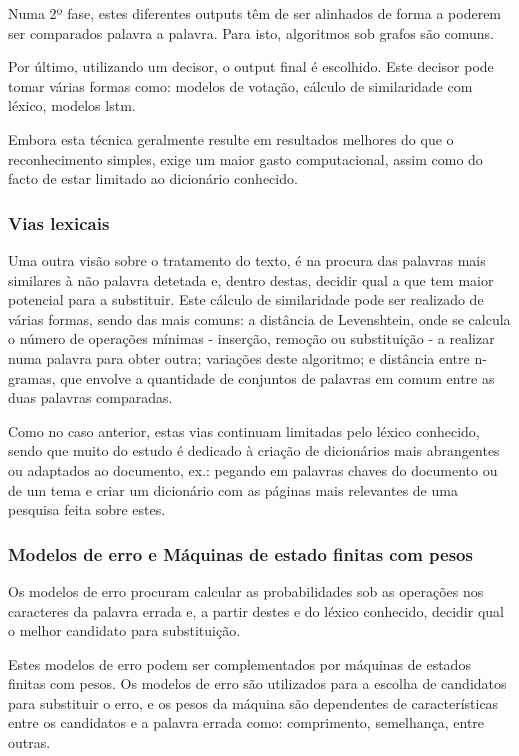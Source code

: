 Numa 2º fase, estes diferentes outputs têm de ser alinhados de forma a poderem ser comparados palavra a palavra. Para isto, algoritmos sob grafos são comuns.

Por último, utilizando um decisor, o output final é escolhido. Este decisor pode tomar várias formas como: modelos de votação, cálculo de similaridade com léxico, modelos \acrshort{lstm}.

Embora esta técnica geralmente resulte em resultados melhores do que o reconhecimento simples, exige um maior gasto computacional, assim como do facto de estar limitado ao dicionário conhecido.

\subsubsection{Vias lexicais}
Uma outra visão sobre o tratamento do texto, é na procura das palavras mais similares à não palavra detetada e, dentro destas, decidir qual a que tem maior potencial para a substituir. Este cálculo de similaridade pode ser realizado de várias formas, sendo das mais comuns: a distância de Levenshtein, onde se calcula o número de operações mínimas - inserção, remoção ou substituição - a realizar numa palavra para obter outra; variações deste algoritmo; e distância entre n-gramas, que envolve a quantidade de conjuntos de palavras em comum entre as duas palavras comparadas.

Como no caso anterior, estas vias continuam limitadas pelo léxico conhecido, sendo que muito do estudo é dedicado à criação de dicionários mais abrangentes ou adaptados ao documento, ex.: pegando em palavras chaves do documento ou de um tema e criar um dicionário com as páginas mais relevantes de uma pesquisa feita sobre estes.

\subsubsection{Modelos de erro e Máquinas de estado finitas com pesos}
Os modelos de erro procuram calcular as probabilidades sob as operações nos caracteres da palavra errada e, a partir destes e do léxico conhecido, decidir qual o melhor candidato para substituição.

Estes modelos de erro podem ser complementados por máquinas de estados finitas com pesos. Os modelos de erro são utilizados para a escolha de candidatos para substituir o erro, e os pesos da máquina são dependentes de características entre os candidatos e a palavra errada como: comprimento, semelhança, entre outras.

